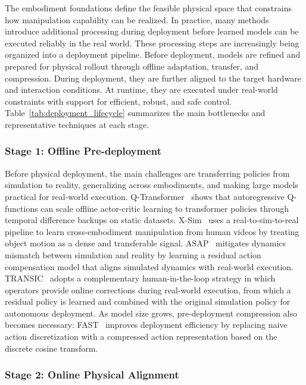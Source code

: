 \documentclass[acmsmall,screen,review]{acmart}
\begin{document}
The embodiment foundations define the feasible physical space that constrains how manipulation capability can be realized. 
In practice, many methods introduce additional processing during deployment before learned models can be executed reliably in the real world. 
These processing steps are increasingly being organized into a deployment pipeline.
Before deployment, models are refined and prepared for physical rollout through offline adaptation, transfer, and compression.
During deployment, they are further aligned to the target hardware and interaction conditions.
At runtime, they are executed under real-world constraints with support for efficient, robust, and safe control.
Table~\ref{tab:deployment_lifecycle} summarizes the main bottlenecks and representative techniques at each stage.

\subsubsection{Stage 1: Offline Pre-deployment}\label{subsec:pre_deployment}

Before physical deployment, the main challenges are transferring policies from simulation to reality, generalizing across embodiments, and making large models practical for real-world execution.
Q-Transformer~\cite{chebotar2023qtransformer} shows that autoregressive Q-functions can scale offline actor-critic learning to transformer policies through temporal difference backups on static datasets.
X-Sim~\cite{dan2025xsim} uses a real-to-sim-to-real pipeline to learn cross-embodiment manipulation from human videos by treating object motion as a dense and transferable signal.
ASAP~\cite{he2025asap} mitigates dynamics mismatch between simulation and reality by learning a residual action compensation model that aligns simulated dynamics with real-world execution.
TRANSIC~\cite{jiang2025transic} adopts a complementary human-in-the-loop strategy in which operators provide online corrections during real-world execution, from which a residual policy is learned and combined with the original simulation policy for autonomous deployment.
As model size grows, pre-deployment compression also becomes necessary: FAST~\cite{pertsch2025fast} improves deployment efficiency by replacing naive action discretization with a compressed action representation based on the discrete cosine transform.

\subsubsection{Stage 2: Online Physical Alignment}\label{subsec:online_alignment}
\end{document}
